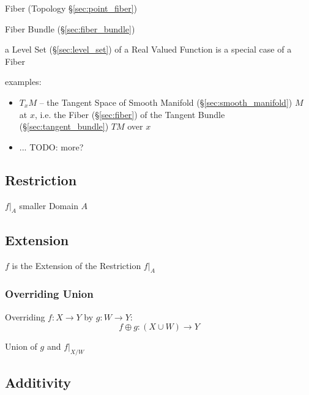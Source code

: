 Fiber (Topology \S\ref{sec:point_fiber})

Fiber Bundle (\S\ref{sec:fiber_bundle})

a Level Set (\S\ref{sec:level_set}) of a Real Valued Function is a special case
of a Fiber

examples:
\begin{itemize}
  \item $T_x M$ -- the Tangent Space of Smooth Manifold
    (\S\ref{sec:smooth_manifold}) $M$ at $x$, i.e. the Fiber (\S\ref{sec:fiber})
    of the Tangent Bundle (\S\ref{sec:tangent_bundle}) $T M$ over $x$
  \item ... TODO: more?
\end{itemize}



\subsection{Restriction}\label{sec:function_restriction}

$f|_A$ smaller Domain $A$



\subsection{Extension}\label{sec:function_extension}

$f$ is the Extension of the Restriction $f|_A$



\subsubsection{Overriding Union}\label{sec:overriding_union}

Overriding $f : X \to Y$ by $g : W \to Y$:
\[
  f \oplus g : (X \cup W) \to Y
\]

Union of $g$ and $f|_{X/W}$



\subsection{Additivity}\label{sec:additivity}

